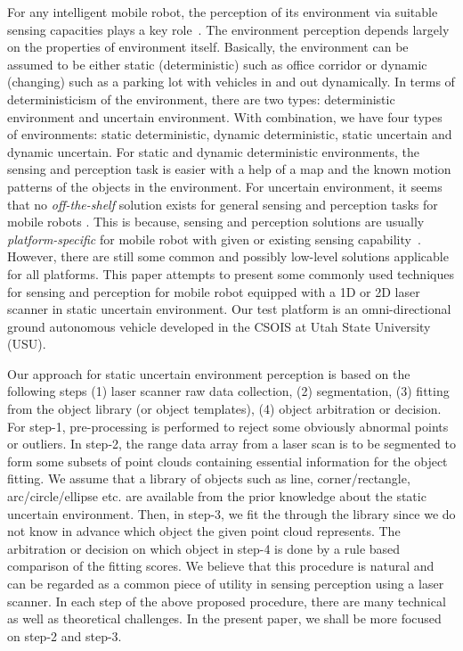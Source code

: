 \documentclass[twocolumn]{IEEEtran}
\begin{document}
For any intelligent mobile robot, the perception of its environment via suitable sensing capacities plays a key role~\cite{Adams99,Nourbakhsh97}. The  environment perception depends largely on the properties of environment itself. Basically, the environment can be assumed to be either static (deterministic) such as office corridor  or dynamic (changing) such as a   parking lot with vehicles in and out dynamically. In terms of deterministicism of the environment, there are two types: deterministic environment and uncertain environment.
With combination, we have four types of environments: static deterministic, dynamic deterministic, static uncertain and dynamic uncertain. For static and dynamic deterministic environments, the sensing and perception task is easier with a help of a map and the known motion patterns of the objects in the environment. For uncertain environment, it seems that no {\em off-the-shelf} solution exists for general sensing and perception tasks for mobile robots \cite{Adams99}. This is because,  sensing and perception  solutions  are usually {\em platform-specific}  for mobile robot with given or existing sensing capability~\cite{Adams99,Nourbakhsh97}. However, there are still some common and possibly low-level solutions applicable for all platforms. This paper attempts to present some commonly used  techniques for sensing and perception for  mobile robot equipped with a 1D or 2D laser scanner in static uncertain environment.
Our test platform is an omni-directional ground autonomous vehicle developed in the CSOIS at Utah State University (USU).



Our approach for static uncertain environment perception is based on the following steps (1) laser scanner raw data collection, (2) segmentation, (3) fitting from the object library (or object templates), (4) object arbitration or decision. 
For step-1, pre-processing is performed to reject some obviously abnormal points or outliers.
In step-2, the range data array from a laser scan is to be segmented to form some subsets of point clouds containing essential information for the object fitting. We assume that a library of objects such as line, corner/rectangle, arc/circle/ellipse etc. are available from the prior knowledge about the static uncertain environment.
Then, in step-3, we fit the through the library since we do not know in advance which object the given point cloud represents. The arbitration or decision on which object in step-4 is done by a rule based comparison of the fitting scores. We believe that this procedure is natural and can be regarded as a common piece of utility in sensing perception using a laser scanner. In each step of the above proposed procedure, there are many technical as well as theoretical challenges. In the present paper, we shall be more focused on step-2 and step-3. 
\end{document}
